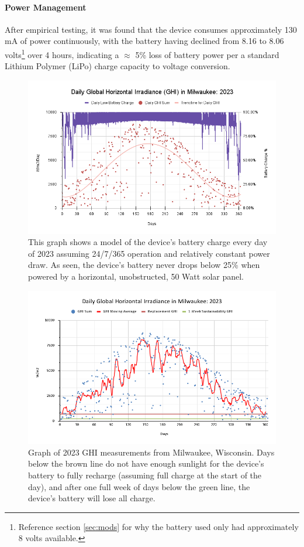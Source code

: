 \documentclass[fleqn,10pt]{SelfArx} %
\begin{document}
	\paragraph*{Power Management}
	After empirical testing, it was found that the device consumes approximately 130 mA of power continuously, with the battery having declined from 8.16 to 8.06 volts\footnote{Reference section \ref{sec:mods} for why the battery used only had approximately 8 volts available.} over 4 hours, indicating a $\approx$ 5\% loss of battery power per a standard Lithium Polymer (LiPo) charge capacity to voltage conversion. 
	
	\begin{figure}[h]
		\centering
		\includegraphics[width=1\linewidth]{Figures/BatteryYear}
		\caption[Battery Charge: 2023]{This graph shows a model of the device's battery charge every day of 2023 assuming 24/7/365 operation and relatively constant power draw. As seen, the device's battery never drops below 25\% when powered by a horizontal, unobstructed, 50 Watt solar panel. }
		\label{fig:BatteryYear}
	\end{figure}
	\begin{figure}[h]
		\centering
		\includegraphics[width=1\linewidth]{Figures/MKE_GHI}
		\caption[Daily GHI in Milwaukee]{Graph of 2023 GHI measurements from Milwaukee, Wisconsin. Days below the brown line do not have enough sunlight for the device's battery to fully recharge (assuming full charge at the start of the day), and after one full week of days below the green line, the device's battery will lose all charge.}
		\label{fig:GHI}
	\end{figure} 
	
\end{document}
